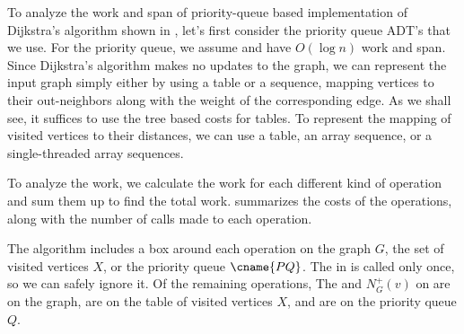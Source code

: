 To analyze the work and span of priority-queue based implementation of
Dijkstra's algorithm shown in , let's first
consider the priority queue ADT's that we use.
%
For the priority queue, we assume  and
 have $O(\log n)$ work and span.  
%
Since Dijkstra's algorithm makes no updates to the graph, we can
represent the input graph simply either by using a table or a
sequence, mapping vertices to their out-neighbors along with the
weight of the corresponding edge.
%
As we shall see, it suffices to use the tree based costs for tables.
%
To represent the mapping of visited vertices to their distances, we
can use a table, an array sequence, or a single-threaded array
sequences.
%

To analyze the work, we calculate the work for each different kind of
operation and sum them up to find the total work.
 summarizes the costs of the operations,
along with the number of calls made to each operation.

The algorithm includes a box around each operation on the graph $G$,
the set of visited vertices $X$, or the priority queue $\cname{PQ}$.
The  in  is called only once,
so we can safely ignore it.  Of the remaining operations, The
 and $N_G^+(v)$ on  are on the
graph,  are on the table
of visited vertices $X$, and
 are on the priority
queue $Q$.


